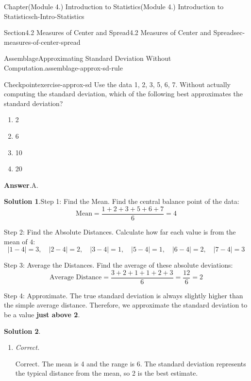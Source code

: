 \documentclass[oneside,10pt,]{book}
\newcommand{\blocktitlefont}{\relax}
\newcommand{\terminology}[1]{\textbf{#1}}
\newcommand{\lititle}[1]{{\slshape#1}}
\begin{document}
\begin{chapterptx}{Chapter}{(Module 4.) Introduction to Statistics}{}{(Module 4.) Introduction to Statistics}{}{}{ch-Intro-Statistics}
\begin{sectionptx}{Section}{4.2 Measures of Center and Spread}{}{4.2 Measures of Center and Spread}{}{}{sec-measures-of-center-spread}
\begin{assemblage}{Assemblage}{Approximating Standard Deviation Without Computation.}{assemblage-approx-sd-rule}
\begin{enumerate}
\end{enumerate}
%
\end{assemblage}
\begin{inlineexercise}{Checkpoint}{}{exercise-approx-sd}%
Use the data 1, 2, 3, 5, 6, 7. Without actually computing the standard deviation, which of the following best approximates the standard deviation?%
\par
%
\begin{enumerate}[label={\Alph*.}]
\item{}2%
\item{}6%
\item{}10%
\item{}20%
\end{enumerate}
%
\par\smallskip%
\noindent\textbf{\blocktitlefont Answer}.\hypertarget{exercise-approx-sd-2}{}\quad{}A.%
\par\smallskip%
\noindent\textbf{\blocktitlefont Solution 1}.\hypertarget{exercise-approx-sd-3}{}\quad{}Step 1: Find the Mean. Find the central balance point of the data:%
\begin{equation*}
\text{Mean} = \frac{1 + 2 + 3 + 5 + 6 + 7}{6} = 4
\end{equation*}
%
\par
Step 2: Find the Absolute Distances. Calculate how far each value is from the mean of \(4\):%
\begin{equation*}
|1-4|=3, \quad |2-4|=2, \quad |3-4|=1, \quad |5-4|=1, \quad |6-4|=2, \quad |7-4|=3
\end{equation*}
%
\par
Step 3: Average the Distances. Find the average of these absolute deviations:%
\begin{equation*}
\text{Average Distance} = \frac{3 + 2 + 1 + 1 + 2 + 3}{6} = \frac{12}{6} = 2
\end{equation*}
%
\par
Step 4: Approximate. The true standard deviation is always slightly higher than the simple average distance. Therefore, we approximate the standard deviation to be a value \terminology{just above 2}.%
\par\smallskip%
\noindent\textbf{\blocktitlefont Solution 2}.\hypertarget{exercise-approx-sd-4}{}\quad{}%
\begin{enumerate}[label={\Alph*.}]
\item{}\lititle{Correct.}\par%
Correct. The mean is 4 and the range is 6. The standard deviation represents the typical distance from the mean, so 2 is the best estimate.%

\end{enumerate}
\end{inlineexercise}
\end{sectionptx}
\end{chapterptx}
\end{document}
